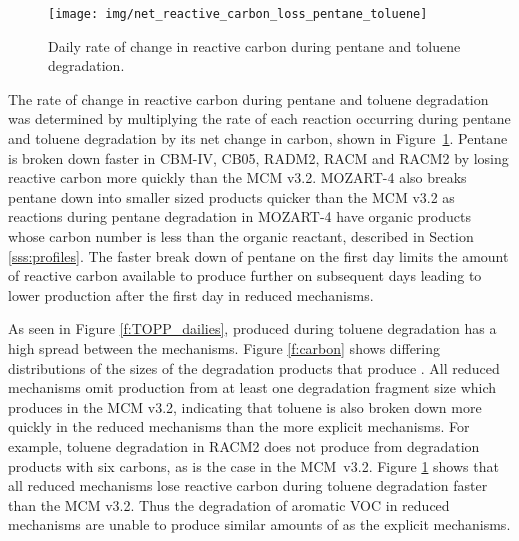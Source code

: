 %
\begin{figure}
    \centering
    \caption{Daily rate of change in reactive carbon during pentane and toluene degradation.}
    \texttt{[image: img/net\_reactive\_carbon\_loss\_pentane\_toluene]}
    \vspace{-2mm}
    \label{f:net_carbon_loss}
\end{figure}
%
The rate of change in reactive carbon during pentane and toluene degradation was determined by multiplying the rate of each reaction occurring during pentane and toluene degradation by its net change in carbon, shown in \mbox{Figure \ref{f:net_carbon_loss}}.
Pentane is broken down faster in CBM-IV, CB05, RADM2, RACM and RACM2 by losing reactive carbon more quickly than the MCM v3.2.
MOZART-4 also breaks pentane down into smaller sized products quicker than the MCM v3.2 as reactions during pentane degradation in MOZART-4 have organic products whose carbon number is less than the organic reactant, described in Section \ref{sss:profiles}.
The faster break down of pentane on the first day limits the amount of reactive carbon available to produce further  on subsequent days leading to lower  production after the first day in reduced mechanisms.

As seen in Figure \ref{f:TOPP_dailies},  produced during toluene degradation has a high spread between the mechanisms.
Figure \ref{f:carbon} shows differing distributions of the sizes of the degradation products that produce .
All reduced mechanisms omit  production from at least one degradation fragment size which produces  in the MCM v3.2, indicating that toluene is also broken down more quickly in the reduced mechanisms than the more explicit mechanisms.
For example, toluene degradation in RACM2 does not produce  from degradation products with six carbons, as is the case in the \mbox{MCM v3.2}.  
Figure \ref{f:net_carbon_loss} shows that all reduced mechanisms lose reactive carbon during toluene degradation faster than the MCM v3.2.
Thus the degradation of aromatic VOC in reduced mechanisms are unable to produce similar amounts of  as the explicit mechanisms.
